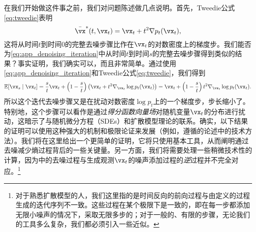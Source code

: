 \documentclass[../../book-main_zh.tex]{subfiles}
\begin{document}
在我们开始做这件事之前，我们对问题陈述做几点说明。首先，Tweedie公式\eqref{eq:tweedie}表明
\begin{equation}
    \bar{\vx}^{\ast}(t, \vx_{t}) = \vx_{t} + t^{2}\nabla p_{t}(\vx_{t}),
\end{equation}
这将从时间\(t\)到时间\(0\)的完整去噪步骤比作在\(\vx_{t}\)的对数密度上的梯度步。我们能否为\eqref{eq:app_denoising_iteration}中从时间\(t\)到时间\(s\)的完整去噪步骤得到类似的结果？事实证明，我们确实可以，而且非常简单。通过使用\eqref{eq:app_denoising_iteration}和Tweedie公式\eqref{eq:tweedie}，我们得到
\begin{equation}\label{eq:app_denoising_iteration_score}
    \Ex[\vx_{s} \mid \vx_{t}] = \frac{s}{t}\vx_{t} + \bp{1 - \frac{s}{t}}\bp{\vx_{t} + t^{2}\nabla_{\vx_{t}}\log p_{t}(\vx_{t})} = \vx_{t} + \bp{1 - \frac{s}{t}}t^{2}\nabla_{\vx_{t}}\log p_{t}(\vx_{t}).
\end{equation}
所以这个迭代去噪步骤又是在扰动对数密度\(\log p_{t}\)上的一个梯度步，步长缩小了。特别地，这个步骤可以看作是通过\textit{得分函数向量场}对随机变量\(\vx_{t}\)的分布进行扰动，这暗示了与随机微分方程（SDEs）和扩散模型理论的联系\cite{song2020score}。确实，以下结果的证明可以使用这种强大的机制和极限论证来发展（例如，遵循\cite{DBLP:conf/iclr/ChenC0LSZ23}的论述中的技术方法）。我们将在这里给出一个更简单的证明，它将只使用基本工具，从而阐明通过去噪减少熵过程背后的一些关键量。另一方面，我们将需要处理一些稍微技术性的计算，因为中的去噪过程与生成观测\(\vx_{t}\)的噪声添加过程的\textit{逆}过程并不完全对应。\footnote{对于熟悉扩散模型的人，我们这里指的是时间反向的前向过程与由定义的过程生成的迭代序列不一致。这些过程在某个极限下是一致的，即在每一步都添加无限小噪声的情况下，采取无限多步的；对于一般的、有限的步骤，无论我们的工具多么复杂，我们都必须引入一些近似。}
\end{document}
